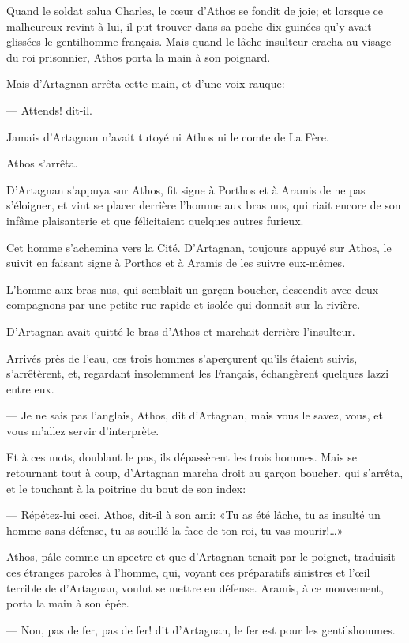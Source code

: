 Quand le soldat salua Charles, le cœur d'Athos se fondit de joie; et lorsque ce malheureux revint à lui, il put trouver dans sa poche dix guinées qu'y avait glissées le gentilhomme français. Mais quand le lâche insulteur cracha au visage du roi prisonnier, Athos porta la main à son poignard.

Mais d'Artagnan arrêta cette main, et d'une voix rauque:

— Attends! dit-il.

Jamais d'Artagnan n'avait tutoyé ni Athos ni le comte de La Fère.

Athos s'arrêta.

D'Artagnan s'appuya sur Athos, fit signe à Porthos et à Aramis de ne pas s'éloigner, et vint se placer derrière l'homme aux bras nus, qui riait encore de son infâme plaisanterie et que félicitaient quelques autres furieux.

Cet homme s'achemina vers la Cité. D'Artagnan, toujours appuyé sur Athos, le suivit en faisant signe à Porthos et à Aramis de les suivre eux-mêmes.

L'homme aux bras nus, qui semblait un garçon boucher, descendit avec deux compagnons par une petite rue rapide et isolée qui donnait sur la rivière.

D'Artagnan avait quitté le bras d'Athos et marchait derrière l'insulteur.

Arrivés près de l'eau, ces trois hommes s'aperçurent qu'ils étaient suivis, s'arrêtèrent, et, regardant insolemment les Français, échangèrent quelques lazzi entre eux.

— Je ne sais pas l'anglais, Athos, dit d'Artagnan, mais vous le savez, vous, et vous m'allez servir d'interprète.

Et à ces mots, doublant le pas, ils dépassèrent les trois hommes. Mais se retournant tout à coup, d'Artagnan marcha droit au garçon boucher, qui s'arrêta, et le touchant à la poitrine du bout de son index:

— Répétez-lui ceci, Athos, dit-il à son ami: «Tu as été lâche, tu as insulté un homme sans défense, tu as souillé la face de ton roi, tu vas mourir!\dots»

Athos, pâle comme un spectre et que d'Artagnan tenait par le poignet, traduisit ces étranges paroles à l'homme, qui, voyant ces préparatifs sinistres et l'œil terrible de d'Artagnan, voulut se mettre en défense. Aramis, à ce mouvement, porta la main à son épée.

— Non, pas de fer, pas de fer! dit d'Artagnan, le fer est pour les gentilshommes.


